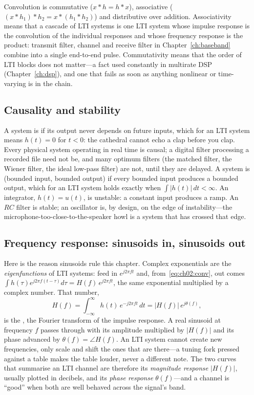 Convolution is commutative ($x*h=h*x$), associative ($(x*h_1)*h_2=x*(h_1*h_2)$) and
distributive over addition. Associativity means that a cascade of LTI systems is one LTI system
whose impulse response is the convolution of the individual responses and whose frequency
response is the product: transmit filter, channel and receive filter in
Chapter~\ref{ch:baseband} combine into a single end-to-end pulse. Commutativity means that the
order of LTI blocks does not matter---a fact used constantly in multirate DSP
(Chapter~\ref{ch:dsp}), and one that fails as soon as anything nonlinear or time-varying is in the
chain.

\subsection{Causality and stability}

A system is  if its output never depends on future inputs, which for an LTI system
means $h(t)=0$ for $t<0$: the cathedral cannot echo a clap before you clap. Every physical system
operating in real time is causal; a digital filter processing a recorded file need not be, and many
optimum filters (the matched filter, the Wiener filter, the ideal low-pass filter) are not, until
they are delayed. A system is  (bounded input, bounded output) if every bounded
input produces a bounded output, which for an LTI system holds exactly when $\int|h(t)|\,dt<\infty$.
An integrator, $h(t)=u(t)$, is unstable: a constant input produces a ramp. An $RC$ filter is stable;
an oscillator is, by design, on the edge of instability---the microphone-too-close-to-the-speaker
howl is a system that has crossed that edge.

\subsection{Frequency response: sinusoids in, sinusoids out}

Here is the reason sinusoids rule this chapter. Complex exponentials are the \emph{eigenfunctions}
of LTI systems: feed in $e^{j2\pi ft}$ and, from~\eqref{eq:ch02:conv}, out comes
$\int h(\tau)e^{j2\pi f(t-\tau)}d\tau=H(f)\,e^{j2\pi ft}$, the same exponential multiplied by a
complex number. That number,
\begin{equation}
H(f)=\int_{-\infty}^{\infty}h(t)\,e^{-j2\pi ft}\,dt=|H(f)|\,e^{j\theta(f)},
\end{equation}
is the , the Fourier transform of the impulse response. A real sinusoid
at frequency $f$ passes through with its amplitude multiplied by $|H(f)|$ and its phase advanced
by $\theta(f)=\angle H(f)$. An LTI system cannot create new frequencies, only scale and shift the
ones that are there---a tuning fork pressed against a table makes the table louder, never a different
note. The two curves that summarise an LTI channel are therefore its \emph{magnitude response}
$|H(f)|$, usually plotted in decibels, and its \emph{phase response} $\theta(f)$---and a channel is
``good'' when both are well behaved across the signal's band.

